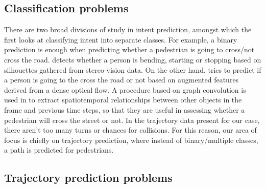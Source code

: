 \documentclass{article}
\begin{document}
\subsection{Classification problems}
There are two broad divisions of study in intent prediction, amongst which the first looks at classifying intent into separate classes. For example, a binary prediction is enough when predicting whether a pedestrian is going to cross/not cross the road.  \cite{kohler_stereo-vision-based_2015} detects whether a person is bending, starting or stopping based on silhouettes gathered from stereo-vision data. On the other hand, \cite{keller_will_2014} tries to predict if a person is going to the cross the road or not based on augmented features derived from a dense optical flow. A procedure based on graph convolution is used in \cite{liu_spatiotemporal_2020} to extract spatiotemporal relationships between other objects in the frame and previous time steps, so that they are useful in assessing whether a pedestrian will cross the street or not.  In the trajectory data present for our case, there aren't too many turns or chances for collisions. For this reason, our area of focus is chiefly on trajectory prediction, where instead of binary/multiple classes, a path is predicted for pedestrians. 
\subsection{Trajectory prediction problems}
\end{document}
